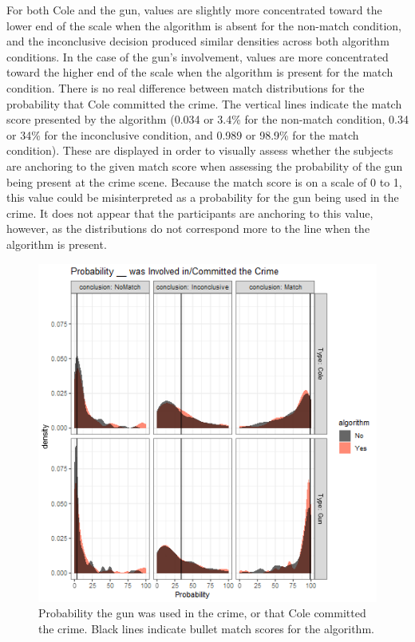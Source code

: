 \documentclass[print]{nuthesis}
\begin{document}
For both Cole and the gun, values are slightly more concentrated toward the lower end of the scale when the algorithm is absent for the non-match condition, and the inconclusive decision produced similar densities across both algorithm conditions.
In the case of the gun's involvement, values are more concentrated toward the higher end of the scale when the algorithm is present for the match condition.
There is no real difference between match distributions for the probability that Cole committed the crime.
The vertical lines indicate the match score presented by the algorithm (0.034 or 3.4\% for the non-match condition, 0.34 or 34\% for the inconclusive condition, and 0.989 or 98.9\% for the match condition).
These are displayed in order to visually assess whether the subjects are anchoring to the given match score when assessing the probability of the gun being present at the crime scene.
Because the match score is on a scale of 0 to 1, this value could be misinterpreted as a probability for the gun being used in the crime.
It does not appear that the participants are anchoring to this value, however, as the distributions do not correspond more to the line when the algorithm is present.

\begin{figure}

{\centering \includegraphics[width=\linewidth]{images/probalgorithm} 

}

\caption{Probability the gun was used in the crime, or that Cole committed the crime. Black lines indicate bullet match scores for the algorithm.}\label{fig:probalgorithm}
\end{figure}
\end{document}
